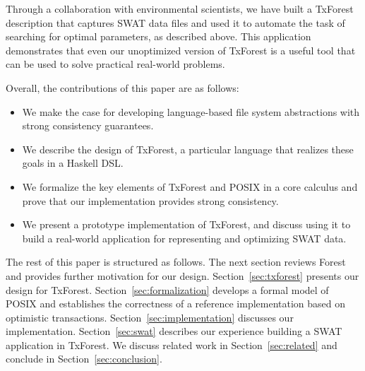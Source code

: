 %
%
Through a collaboration with environmental scientists, we have built a
TxForest description that captures SWAT data files and used it to
automate the task of searching for optimal parameters, as described
above. This application demonstrates that even our unoptimized version
of TxForest is a useful tool that can be used to solve practical
real-world problems. 

%
%
Overall, the contributions of this paper are as follows:
\begin{itemize}
\item We make the case for developing language-based file system
  abstractions with strong consistency guarantees.
\item We describe the design of TxForest, a particular language that
  realizes these goals in a Haskell DSL.
\item We formalize the key elements of TxForest and POSIX in a core
  calculus and prove that our implementation provides strong
  consistency.
\item We present a prototype implementation of TxForest, and discuss
  using it to build a real-world application for representing and
  optimizing SWAT data. 
\end{itemize}
%
The rest of this paper is structured as follows. The next section
reviews Forest and provides further motivation for our
design. Section~\ref{sec:txforest} presents our design for
TxForest. Section~\ref{sec:formalization} develops a formal model of
POSIX and establishes the correctness of a reference implementation
based on optimistic transactions. Section~\ref{sec:implementation}
discusses our implementation. Section~\ref{sec:swat} describes our
experience building a SWAT application in TxForest. We discuss related
work in Section~\ref{sec:related} and conclude in
Section~\ref{sec:conclusion}.
